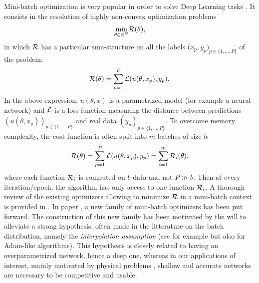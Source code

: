  
Mini-batch optimization is very popular in order to solve Deep Learning tasks \cite{image_recognition,language_recognition,plasma}. 
It consists in the resolution of highly non-convex optimization problems \cite{DL_opti}
\begin{equation*}
\displaystyle{\min_{\theta \in \mathbb{R}^N}} \mathcal{R}(\theta),
\end{equation*}
in which $\mathcal{R}$ has a particular sum-structure on all the labels ($x_p,y_p)_{p\in\{1,...,P\}}$ of the problem:
\begin{equation*}
	\mathcal{R}(\theta) = \displaystyle{\sum_{p=1}^{P} \mathcal{L}(u(\theta,x_p), y_p)}.
\end{equation*}
In the above expression, %
$u(\theta,x)$ is a parametrized model (for example a neural network) and $\mathcal{L}$ is a loss function measuring the distance between predictions $(u(\theta,x_p))_{p\in\{1,...,P\}}$
and real data $(y_p)_{p\in\{1,...,P\}}$. 
To overcome memory complexity, the cost function is often split into $m$ batches of size $b$:
\begin{equation}
	\mathcal{R}(\theta) = \displaystyle{\sum_{p=1}^{P} \mathcal{L}(u(\theta,x_p), y_p)} = \sum_{i=1}^m \mathcal{R}_i(\theta),
	\label{pb_somme_fini}
\end{equation}
where each function $\mathcal{R}_i$ is computed on $b$ data and not $P \gg b$. 
Then at every iteration/epoch, the algorithm has only access to one function $\mathcal{R}_i$.
A thorough review of the existing optimizers allowing to minimize $\mathcal{R}$ in a mini-batch context is provided in \cite{partI}. 
In paper \cite{partI}, 
 a new family of mini-batch optimizers has been put forward. 
The construction of this new family has been motivated by the will to alleviate a strong hypothesis, often made in the litterature 
on the batch distribution, namely the {\em interpolation assumption} (see \cite{ESG_upper_bound,ESG_IG} for example but also  \cite{sgd_prec,adam1,adam2,zou_rms,rms_not_bounded}
for Adam-like algorithms).
This hypothesis is closely related to having an overparametrized network, hence a deep one, whereas 
in our applications of interest, mainly motivated by physical problems \cite{FV_scheme,reentry,acc_newt,FRANCK,plasma,KluthRipoll}, shallow and accurate networks are necessary to
be competitive and usable.\\
